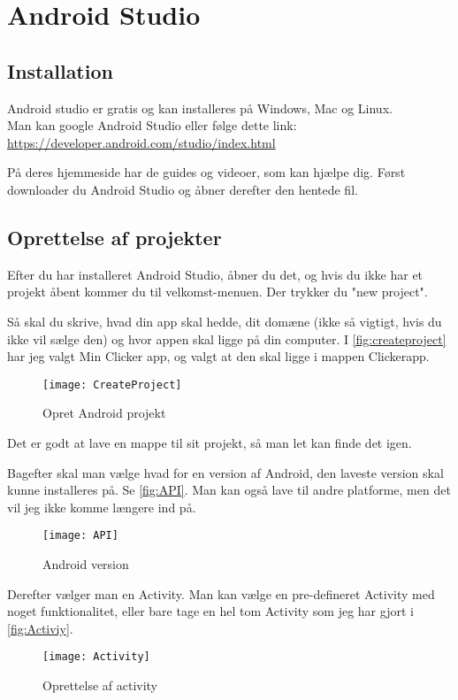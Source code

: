 \chapter{Android Studio}

\section{Installation}
Android studio er gratis og kan installeres på Windows, Mac og Linux.\\
Man kan google Android Studio eller følge dette link:\\
\url{https://developer.android.com/studio/index.html}

På deres hjemmeside har de guides og videoer, som kan hjælpe dig.
Først downloader du Android Studio og åbner derefter den hentede fil.

\section{Oprettelse af projekter}
Efter du har installeret Android Studio, åbner du det, og hvis du ikke har et projekt åbent kommer du til velkomst-menuen. Der trykker du "new project".

Så skal du skrive, hvad din app skal hedde, dit domæne (ikke så vigtigt, hvis du ikke vil sælge den) og hvor appen skal ligge på din computer. I \autoref{fig:createproject} har jeg valgt Min Clicker app, og valgt at den skal ligge i mappen Clickerapp. 
\begin{figure}[h]
	\texttt{[image: CreateProject]}
	\caption{Opret Android projekt}
	\label{fig:createproject}
\end{figure}
Det er godt at lave en mappe til sit projekt, så man let kan finde det igen. 

Bagefter skal man vælge hvad for en version af Android, den laveste version skal kunne installeres på. Se \autoref{fig:API}. Man kan også lave til andre platforme, men det vil jeg ikke komme længere ind på. 
\begin{figure}[h]
	\texttt{[image: API]}
	\caption{Android version}
	\label{fig:API}
\end{figure}

Derefter vælger man en Activity.
Man kan vælge en pre-defineret Activity med noget funktionalitet, eller bare tage en hel tom Activity som jeg har gjort i \autoref{fig:Activiy}.

\begin{figure}[h]
	\texttt{[image: Activity]}
	\caption{Oprettelse af activity}
	\label{fig:Activiy}
\end{figure}

